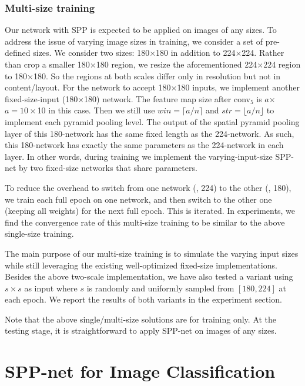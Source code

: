 \documentclass[10pt,journal,cspaper,compsoc]{IEEEtran}
\begin{document}
\subsubsection*{Multi-size training}

Our network with SPP is expected to be applied on images of any sizes. To address the issue of varying image sizes in training, we consider a set of pre-defined sizes.
We consider two sizes: 180$\times$180 in addition to 224$\times$224. Rather than crop a smaller 180$\times$180 region, we resize the aforementioned 224$\times$224 region to 180$\times$180. So the regions at both scales differ only in resolution but not in content/layout. For the network to accept 180$\times$180 inputs, we implement another fixed-size-input (180$\times$180) network. The feature map size after conv$_5$ is $a$$\times$$a=10\times$10 in this case. Then we still use $win=\lceil a/n \rceil$ and $str=\lfloor a/n \rfloor$ to implement each pyramid pooling level.
The output of the spatial pyramid pooling layer of this 180-network has the same fixed length as the 224-network. As such, this 180-network has exactly the same parameters as the 224-network in each layer. In other words, during training we implement the varying-input-size SPP-net by two fixed-size networks that share parameters.

To reduce the overhead to switch from one network (\eg, 224) to the other (\eg, 180), we train each full epoch on one network, and then switch to the other one (keeping all weights) for the next full epoch. This is iterated.
In experiments, we find the convergence rate of this multi-size training to be similar to the above single-size training.

The main purpose of our multi-size training is to simulate the varying input sizes while still leveraging the existing well-optimized fixed-size implementations. Besides the above two-scale implementation, we have also tested a variant using $s\times s$ as input where $s$ is randomly and uniformly sampled from $[180, 224]$ at each epoch. We report the results of both variants in the experiment section.

Note that the above single/multi-size solutions are for training only. At the testing stage, it is straightforward to apply SPP-net on images of any sizes.

\section{SPP-net for Image Classification}
\label{sec:classification}
\end{document}
